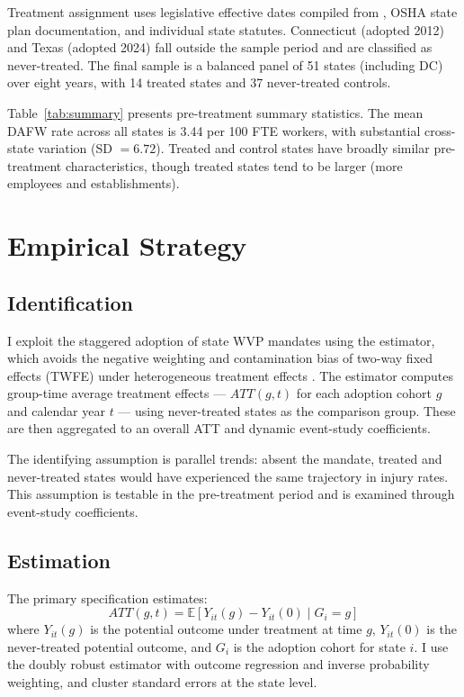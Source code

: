 \documentclass[12pt]{article}
\newcommand{\E}{\mathbb{E}}
\begin{document}
Treatment assignment uses legislative effective dates compiled from \citet{healthaffairs2024}, OSHA state plan documentation, and individual state statutes. Connecticut (adopted 2012) and Texas (adopted 2024) fall outside the sample period and are classified as never-treated. The final sample is a balanced panel of 51 states (including DC) over eight years, with 14 treated states and 37 never-treated controls.



Table~\ref{tab:summary} presents pre-treatment summary statistics. The mean DAFW rate across all states is 3.44 per 100 FTE workers, with substantial cross-state variation (SD $= 6.72$). Treated and control states have broadly similar pre-treatment characteristics, though treated states tend to be larger (more employees and establishments).

\section{Empirical Strategy}

\subsection{Identification}

I exploit the staggered adoption of state WVP mandates using the \citet{callaway2021} estimator, which avoids the negative weighting and contamination bias of two-way fixed effects (TWFE) under heterogeneous treatment effects \citep{goodman2021, dechaisemartin2020, sun2021}. The estimator computes group-time average treatment effects --- $ATT(g,t)$ for each adoption cohort $g$ and calendar year $t$ --- using never-treated states as the comparison group. These are then aggregated to an overall ATT and dynamic event-study coefficients.

The identifying assumption is parallel trends: absent the mandate, treated and never-treated states would have experienced the same trajectory in injury rates. This assumption is testable in the pre-treatment period and is examined through event-study coefficients.

\subsection{Estimation}

The primary specification estimates:
\begin{equation}
ATT(g,t) = \E[Y_{it}(g) - Y_{it}(0) \mid G_i = g]
\end{equation}
where $Y_{it}(g)$ is the potential outcome under treatment at time $g$, $Y_{it}(0)$ is the never-treated potential outcome, and $G_i$ is the adoption cohort for state $i$. I use the doubly robust estimator with outcome regression and inverse probability weighting, and cluster standard errors at the state level.
\end{document}
